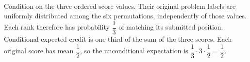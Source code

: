 Condition on the three ordered score values. Their original problem labels are uniformly distributed among the six permutations, independently of those values. Each rank therefore has probability $\dfrac{1}{3}$ of matching its submitted position. Conditional expected credit is one third of the sum of the three scores. Each original score has mean $\dfrac{1}{2}$, so the unconditional expectation is $\dfrac{1}{3}\cdot3\cdot\dfrac{1}{2}=\boxed{\dfrac{1}{2}}$.
